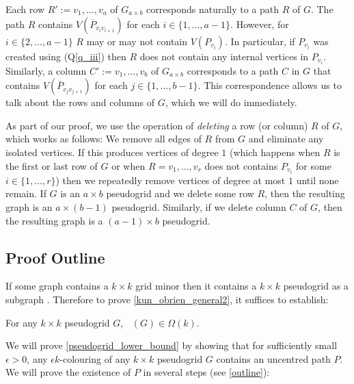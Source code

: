 \documentclass{patmorin}
\newcommand{\defin}[1]{\emph{\color{brightmaroon}#1}}
\DeclareMathOperator{\chilin}{\chi_{\mathrm{lin}}}
\begin{document}

Each row $R':=v_1,\ldots,v_a$ of $G_{a\times b}$ corresponds naturally to a path $R$ of $G$. The path $R$ contains $V(\overline{P}_{v_iv_{i+1}})$ for each $i\in\{1,\ldots,a-1\}$.  However, for $i\in\{2,\ldots,a-1\}$ $R$ may or may not contain $V(P_{v_i})$.  In particular, if $P_{v_i}$ was created using (Q\ref{q_iii}) then $R$ does not contain any internal vertices in $P_{v_i}$. Similarly, a column $C':=v_1,\ldots,v_b$ of $G_{a\times b}$ corresponds to a path $C$  in $G$ that contains $V(\overline{P}_{v_jv_{j+1}})$ for each $j\in\{1,\ldots,b-1\}$. This correspondence allows us to talk about the rows and columns of $G$, which we will do immediately.

As part of our proof, we use the operation of \defin{deleting} a row (or column) $R$ of $G$, which works as follows:  We remove all edges of $R$ from $G$ and eliminate any isolated vertices.  If this produces vertices of degree $1$ (which happens when $R$ is the first or last row of $G$ or when $R=v_1,\ldots,v_r$ does not contains $P_{v_i}$ for some $i\in\{1,\ldots,r\}$) then we repeatedly remove vertices of degree at most $1$ until none remain.  If $G$ is an $a\times b$ pseudogrid and we delete some row $R$, then the resulting graph is an $a\times (b-1)$ pseudogrid.  Similarly, if we delete column $C$ of $G$, then the resulting graph is a $(a-1)\times b$ pseudogrid.

\subsection{Proof Outline}

If some graph contains a $k\times k$ grid minor then it contains a $k\times k$ pseudogrid as a subgraph \cite{kun.obrien.ea:polynomial}.  Therefore to prove \cref{kun_obrien_general2}, it suffices to establish:

\begin{lem}\label{pseudogrid_lower_bound}
  For any $k\times k$ pseudogrid $G$, $\chilin(G)\in\Omega(k)$.
\end{lem}

We will prove \cref{pseudogrid_lower_bound} by showing that for sufficiently small $\epsilon >0$,  any $\epsilon k$-colouring of any $k\times k$ pseudogrid $G$ contains an uncentred path $P$. We will prove the existence of $P$ in several steps (see \cref{outline}):
\end{document}
